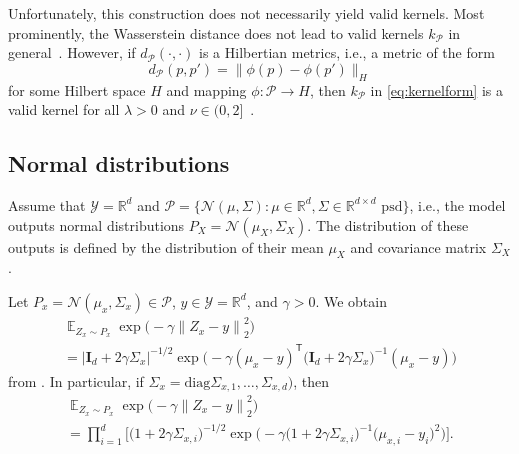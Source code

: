 \documentclass{article}
\DeclareMathOperator{\Exp}{\mathbb{E}}
\begin{document}
Unfortunately, this construction does not necessarily yield valid kernels.
Most prominently, the Wasserstein distance does not lead to valid kernels $k_{\mathcal{P}}$ in general~\citep[Chapter~8.3]{Peyre2018}. However, if $d_{\mathcal{P}}(\cdot, \cdot)$
is a Hilbertian metrics, i.e., a metric of the form
\begin{equation*}
    d_{\mathcal{P}}(p, p') = \big\|\phi(p) - \phi(p') \big\|_{H}
\end{equation*}
for some Hilbert space $H$ and mapping $\phi \colon \mathcal{P} \to H$, then
$k_{\mathcal{P}}$ in \cref{eq:kernelform} is a valid kernel for all $\lambda > 0$ and
$\nu \in (0, 2]$~\citep[Corollary~3.3.3, Proposition~3.2.7]{Berg1984}.

\subsection{Normal distributions}
\label{app:normal}

Assume that $\mathcal{Y} = \mathbb{R}^d$ and
$\mathcal{P} = \{\mathcal{N}(\mu, \Sigma) \colon \mu \in \mathbb{R}^d, \Sigma \in \mathbb{R}^{d \times d} \text{ psd}\}$,
i.e., the model outputs normal distributions
$P_X = \mathcal{N}(\mu_X, \Sigma_X)$.
The distribution of these outputs is defined by the distribution
of their mean $\mu_X$ and covariance matrix $\Sigma_X$.

Let $P_x = \mathcal{N}(\mu_x, \Sigma_x) \in \mathcal{P}$,
$y \in \mathcal{Y} = \mathbb{R}^d$, and $\gamma > 0$. We obtain
\begin{multline*}
    \Exp_{Z_x \sim P_x} \exp{\Big(- \gamma {\|Z_x - y\|}^2_2\Big)} \\
    = {\big|\mathbf{I}_{d} + 2\gamma \Sigma_x \big|}^{-1/2} \exp{\Big(-\gamma {(\mu_x - y)}^{\mathsf{T}} {\big(\mathbf{I}_d + 2\gamma \Sigma_x
    \big)}^{-1} {(\mu_x - y)}\Big)}
\end{multline*}
from \citet[Theorem~3.2.a3]{mathai1992}. In particular, if
$\Sigma_x = \mathrm{diag}{\Sigma_{x,1}, \ldots, \Sigma_{x,d})}$, then
\begin{multline*}
    \Exp_{Z_x \sim P_x} \exp{\Big(- \gamma {\|Z_x - y\|}^2_2\Big)} \\
    = \prod_{i=1}^{d} \bigg[{\big(1 + 2\gamma \Sigma_{x,i}\big)}^{-1/2} \exp{\Big(-\gamma {\big(1 + 2\gamma \Sigma_{x,i}\big)}^{-1} {\big(\mu_{x,i} - y_i\big)}^2 \Big)}\bigg].
\end{multline*}
\end{document}
